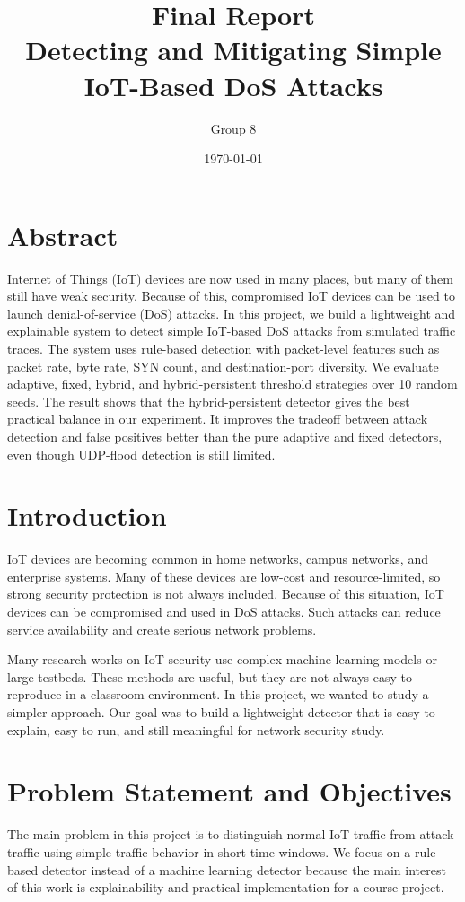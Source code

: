 \documentclass[11pt]{article}
\title{Final Report\\\textbf{Detecting and Mitigating Simple IoT-Based DoS Attacks}}
\author{Group 8}
\date{\today}
\begin{document}
\maketitle

\section*{Abstract}
Internet of Things (IoT) devices are now used in many places, but many of them still have weak
security. Because of this, compromised IoT devices can be used to launch denial-of-service (DoS)
attacks. In this project, we build a lightweight and explainable system to detect simple IoT-based
DoS attacks from simulated traffic traces. The system uses rule-based detection with packet-level
features such as packet rate, byte rate, SYN count, and destination-port diversity. We evaluate
adaptive, fixed, hybrid, and hybrid-persistent threshold strategies over 10 random seeds. The
result shows that the hybrid-persistent detector gives the best practical balance in our
experiment. It improves the tradeoff between attack detection and false positives better than the
pure adaptive and fixed detectors, even though UDP-flood detection is still limited.

\section*{Introduction}
IoT devices are becoming common in home networks, campus networks, and enterprise systems. Many
of these devices are low-cost and resource-limited, so strong security protection is not always
included. Because of this situation, IoT devices can be compromised and used in DoS attacks. Such
attacks can reduce service availability and create serious network problems.

Many research works on IoT security use complex machine learning models or large testbeds. These
methods are useful, but they are not always easy to reproduce in a classroom environment. In this
project, we wanted to study a simpler approach. Our goal was to build a lightweight detector that
is easy to explain, easy to run, and still meaningful for network security study.

\section*{Problem Statement and Objectives}
The main problem in this project is to distinguish normal IoT traffic from attack traffic using
simple traffic behavior in short time windows. We focus on a rule-based detector instead of a
machine learning detector because the main interest of this work is explainability and practical
implementation for a course project.
\end{document}
